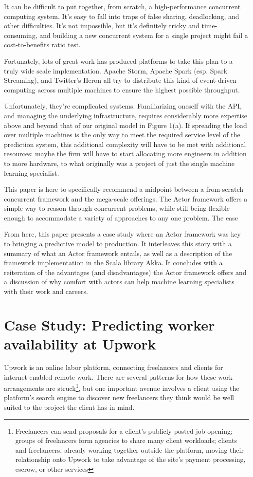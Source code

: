 \documentclass{article}
\begin{document}
 It can be difficult to put together, from scratch, a high-performance
concurrent computing system. It's easy to fall into traps of false sharing,
deadlocking, and other difficulties. It's not impossible, but it's definitely
tricky and time-consuming, and building a new concurrent system for a single
project might fail a cost-to-benefits ratio test.

 Fortunately, lots of great work has produced platforms to take this plan to a
truly wide scale implementation. Apache Storm, Apache Spark (esp. Spark
Streaming), and Twitter's Heron all try to distribute this kind of event-driven
computing across multiple machines to ensure the highest possible throughput.

 Unfortunately, they're complicated systems. Familiarizing oneself with the API,
and managing the underlying infrastructure, requires considerably more expertise
above and beyond that of our original model in Figure 1(a). If spreading the
load over multiple machines is the only way to meet the required service level
of the prediction system, this additional complexity will have to be met with
additional resources: maybe the firm will have to start allocating more
engineers in addition to more hardware, to what originally was a project of just
the single machine learning specialist.

 This paper is here to specifically recommend a midpoint between a from-scratch
concurrent framework and the mega-scale offerings. The Actor framework offers a
simple way to reason through concurrent problems, while still being flexible
enough to accommodate a variety of approaches to any one problem. The ease

 From here, this paper presents a case study where an Actor framework was key to
bringing a predictive model to production. It interleaves this story with a
summary of what an Actor framework entails, as well as a description of the
framework implementation in the Scala library Akka. It concludes with a reiteration
of the advantages (and disadvantages) the Actor framework offers and a
discussion of why comfort with actors can help machine learning specialists with
their work and careers.

\section{Case Study: Predicting worker availability at Upwork}

 Upwork is an online labor platform, connecting freelancers and clients for
internet-enabled remote work. There are several patterns for how these work
arrangements are struck\footnote{Freelancers can send proposals for a client's
publicly posted job opening; groups of freelancers form agencies to share many
client workloads; clients and freelancers, already working together outside the
platform, moving their relationship onto Upwork to take advantage of the site's
payment processing, escrow, or other services}, but one important avenue
involves a client using the platform's search engine to discover new freelancers
they think would be well suited to the project the client has in mind.
\end{document}
